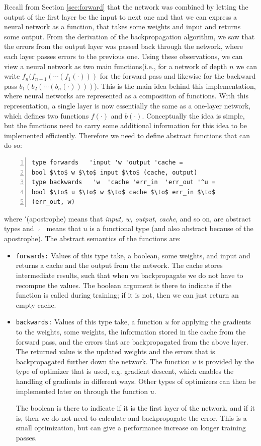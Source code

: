 Recall from Section \ref{sec:forward} that the network was combined by letting
the output of the first layer be the input to next one and that we can express a
neural network as a function, that takes some weights and input and returns some
output. 
From the derivation of the backpropagation algorithm, we saw that the errors
from the output layer was passed back through the network, where each layer
passes errors to the previous one. 
Using these observations, we can view a neural network as two main
functions(i.e., for a network of depth $n$ we can write
$f_n(f_{n-1}(\cdots(f_1(\cdot)))$ for the forward pass and likewise for the
backward pass $b_1(b_{2}(\cdots(b_n(\cdot ))))$). 
This is the main idea behind this implementation, where neural networks are
represented as a composition of functions. 
With this representation, a single layer is now essentially the same as a
one-layer network, which defines two functions $f(\cdot)$ and $b(\cdot)$. 
Conceptually the idea is simple, but the functions need to carry some additional
information for this idea to be implemented efficiently. 
Therefore we need to define abstract functions that can do so:
\begin{lstlisting}[caption={Auxiliary abstract types for specifying neural
networks},language=futhark, numbers = left]
type forwards   'input 'w 'output 'cache = 
bool $\to$ w $\to$ input $\to$ (cache, output)
type backwards   'w  'cache 'err_in  'err_out '^u = 
bool $\to$ u $\to$ w $\to$ cache $\to$ err_in $\to$
(err_out, w)
\end{lstlisting}
where $'$(apostrophe) means that \emph{input, w, output, cache}, and so on, are
abstract types and 
\ $\widehat{\ }\ $\  means that $u$ is a functional type (and also abstract
because of the apostrophe).
The abstract semantics of the functions are:
\begin{itemize}
	\item \texttt{forwards:} Values of this type take, a boolean, some weights, and
	input and returns a cache and the output from the network. 
	The cache stores intermediate results, such that when we backpropagate we do
	not have to recompue the values. 
	The boolean argument is there to indicate if the function is called during
	training; if it is not, then we can just return an empty cache. 
	
	\item \texttt{backwards:} Values of this type take, a function $u$ for applying
	the gradients to the weights, some weights, the information stored in the cache
	from the forward pass, and the errors that are backpropagated from the above
	layer. 
	The returned value is the updated weights and the errors that is backpropagated
	further down the network. 
	The function $u$ is provided by the type of optimizer that is used, e.g.
	gradient descent, which enables the handling of gradients in different ways. 
	Other types of optimizers can then be implemented later on through the function
	$u$.
	
	The boolean is there to indicate if it is the first layer of the network, and
	if it is, then we do not need to calculate and backpropagate the error. 
	This is a small optimization, but can give a performance increase on longer
	training passes.
	
\end{itemize}
